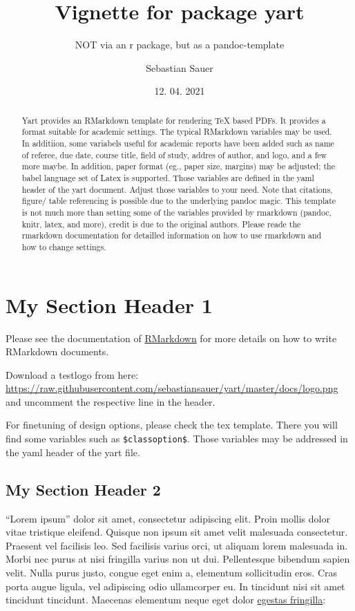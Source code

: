 \documentclass[
  11pt,
  ngerman,
  a4paper,
  oneside]{article}
\title{Vignette for package yart}
\subtitle{NOT via an r package, but as a pandoc-template}
\author{Sebastian Sauer}
\date{12. 04. 2021}
\begin{document}
\maketitle
\begin{abstract}
Yart provides an RMarkdown template for rendering TeX based PDFs. It
provides a format suitable for academic settings. The typical RMarkdown
variables may be used. In additiion, some variabels useful for academic
reports have been added such as name of referee, due date, course title,
field of study, addres of author, and logo, and a few more maybe. In
addition, paper format (eg., paper size, margins) may be adjusted; the
babel language set of Latex is supported. Those variables are defined in
the yaml header of the yart document. Adjust those variables to your
need. Note that citations, figure/ table referencing is possible due to
the underlying pandoc magic. This template is not much more than setting
some of the variables provided by rmarkdown (pandoc, knitr, latex, and
more), credit is due to the original authors. Please reade the rmarkdown
documentation for detailled information on how to use rmarkdown and how
to change settings.
\end{abstract}

\hypertarget{my-section-header-1}{%
\section{My Section Header 1}\label{my-section-header-1}}

Please see the documentation of
\href{http://rmarkdown.rstudio.com/}{RMarkdown} for more details on how
to write RMarkdown documents.

Download a testlogo from here:
\url{https://raw.githubusercontent.com/sebastiansauer/yart/master/docs/logo.png}
and uncomment the respective line in the header.

For finetuning of design options, please check the tex template. There
you will find some variables such as \texttt{\$classoption\$}. Those
variables may be addressed in the yaml header of the yart file.

\hypertarget{my-section-header-2}{%
\subsection{My Section Header 2}\label{my-section-header-2}}

``Lorem ipsum'' dolor sit amet, consectetur adipiscing elit. Proin
mollis dolor vitae tristique eleifend. Quisque non ipsum sit amet velit
malesuada consectetur. Praesent vel facilisis leo. Sed facilisis varius
orci, ut aliquam lorem malesuada in. Morbi nec purus at nisi fringilla
varius non ut dui. Pellentesque bibendum sapien velit. Nulla purus
justo, congue eget enim a, elementum sollicitudin eros. Cras porta augue
ligula, vel adipiscing odio ullamcorper eu. In tincidunt nisi sit amet
tincidunt tincidunt. Maecenas elementum neque eget dolor
\href{http://example.com}{egestas fringilla}:

\printbibliography
\end{document}

